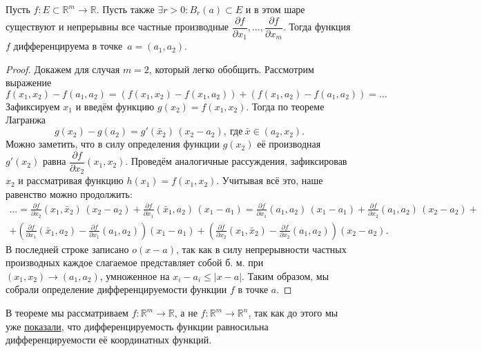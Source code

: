 \begin{theorem}
	Пусть \(f \colon E \subset \mathbb{R}^m \to \mathbb{R}\). Пусть также \(\exists r > 0 : B_r(a) \subset E\) и в этом шаре существуют и непрерывны все частные производные \(\dfrac{\partial f}{\partial x_1}, \ldots, \dfrac{\partial f}{\partial x_m}\). Тогда функция \(f\) дифференцируема в точке~\(a = (a_1, a_2)\).
\end{theorem}
\begin{proof}
	Докажем для случая \(m = 2\), который легко обобщить. Рассмотрим выражение \[
		f(x_1, x_2) - f(a_1, a_2) = (f(x_1, x_2) - f(x_1, a_2)) + (f(x_1, a_2) - f(a_1, a_2)) = \ldots
	\]
	Зафиксируем \(x_1\) и введём функцию \(g(x_2) = f(x_1, x_2)\). Тогда по теореме Лагранжа \[
		g(x_2) - g(a_2) = g'(\bar{x}_2) \, (x_2 - a_2), \ \text{где} \ \bar{x} \in (a_2, x_2).
	\]
	Можно заметить, что в силу определения функции \(g(x_2)\) её производная \(g'(x_2)\) равна \(\dfrac{\partial f}{\partial x_2} (x_1, x_2)\). Проведём аналогичные рассуждения, зафиксировав \(x_2\) и рассматривая функцию \(h(x_1) = f(x_1, x_2)\). Учитывая всё это, наше равенство можно продолжить:
	\begin{multline*}
		\ldots = \frac{\partial f}{\partial x_2} (x_1, \bar{x}_2) \, (x_2 - a_2) + \frac{\partial f}{\partial x_1} (\bar{x}_1, a_2) \, (x_1 - a_1)  
		= \frac{\partial f}{\partial x_1} (a_1, a_2) \, (x_1 - a_1) + \frac{\partial f}{\partial x_2} (a_1, a_2) \, (x_2 - a_2) + \\
		+ \left(\frac{\partial f}{\partial x_1} (\bar{x}_1, a_2) - \frac{\partial f}{\partial x_1} (a_1, a_2) \right) (x_1 - a_1) 
		+ \left(\frac{\partial f}{\partial x_2} (x_1, \bar{x}_2) - \frac{\partial f}{\partial x_2} (a_1, a_2) \right) (x_2 - a_2).
	\end{multline*}
	В последней строке записано \(o(x - a)\), так как в силу непрерывности частных производных каждое слагаемое представляет собой б. м. при \((x_1, x_2) \to (a_1, a_2)\), умноженное на \(x_i - a_i \leqslant |x - a|\). Таким образом, мы собрали определение дифференцируемости функции \(f\) в точке \(a\).
\end{proof}

\begin{remark}
	В теореме мы рассматриваем \(f \colon \mathbb{R}^m \to \mathbb{R}\), а не \(f \colon \mathbb{R}^m \to \mathbb{R}^n\), так как до этого мы уже \hyperlink{t75}{показали}, что дифференцируемость функции равносильна дифференцируемости её координатных функций.
\end{remark}
